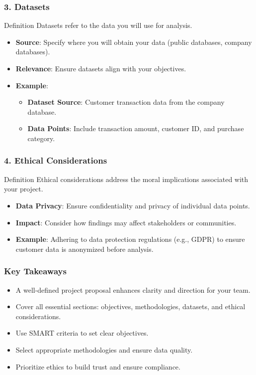 \documentclass[aspectratio=169]{beamer}
\begin{document}
\begin{frame}[fragile]
    \frametitle{3. Datasets}
    \begin{block}{Definition}
        Datasets refer to the data you will use for analysis.
    \end{block}
    \begin{itemize}
        \item \textbf{Source}: Specify where you will obtain your data (public databases, company databases).
        \item \textbf{Relevance}: Ensure datasets align with your objectives.
        \item \textbf{Example}:
            \begin{itemize}
                \item \textbf{Dataset Source}: Customer transaction data from the company database.
                \item \textbf{Data Points}: Include transaction amount, customer ID, and purchase category.
            \end{itemize}
    \end{itemize}
\end{frame}

\begin{frame}[fragile]
    \frametitle{4. Ethical Considerations}
    \begin{block}{Definition}
        Ethical considerations address the moral implications associated with your project.
    \end{block}
    \begin{itemize}
        \item \textbf{Data Privacy}: Ensure confidentiality and privacy of individual data points.
        \item \textbf{Impact}: Consider how findings may affect stakeholders or communities.
        \item \textbf{Example}: Adhering to data protection regulations (e.g., GDPR) to ensure customer data is anonymized before analysis.
    \end{itemize}
\end{frame}

\begin{frame}[fragile]
    \frametitle{Key Takeaways}
    \begin{itemize}
        \item A well-defined project proposal enhances clarity and direction for your team.
        \item Cover all essential sections: objectives, methodologies, datasets, and ethical considerations.
        \item Use SMART criteria to set clear objectives.
        \item Select appropriate methodologies and ensure data quality.
        \item Prioritize ethics to build trust and ensure compliance.
    \end{itemize}
\end{frame}
\end{document}
